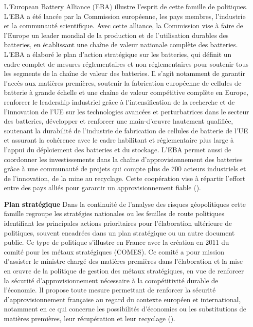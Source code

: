 L'European Battery Alliance (EBA) illustre l'esprit de cette famille de politiques. L'EBA a été lancée par la Commission européenne, les pays membres, l'industrie et la communauté scientifique. Avec cette alliance, la Commission vise à faire de l'Europe un leader mondial de la production et de l'utilisation durables des batteries, en établissant une chaîne de valeur nationale complète des batteries. \smallbreak
L'EBA a élaboré le plan d'action stratégique sur les batteries, qui définit un cadre complet de mesures réglementaires et non réglementaires pour soutenir tous les segments de la chaîne de valeur des batteries. Il s'agit notamment de garantir l'accès aux matières premières, soutenir la fabrication européenne de cellules de batterie à grande échelle et une chaîne de valeur compétitive complète en Europe, renforcer le leadership industriel grâce à l'intensification de la recherche et de l'innovation de l'UE sur les technologies avancées et perturbatrices dans le secteur des batteries, développer et renforcer une main-d'œuvre hautement qualifiée, soutenant la durabilité de l'industrie de fabrication de cellules de batterie de l'UE et assurant la cohérence avec le cadre habilitant et réglementaire plus large à l'appui du déploiement des batteries et du stockage. 
L'EBA permet aussi de coordonner les investissements dans la chaîne d'approvisionnement des batteries grâce à une communauté de projets qui compte plus de 700 acteurs industriels et de l'innovation, de la mine au recyclage. Cette coopération vise à répartir l'effort entre des pays alliés pour garantir un approvisionnement fiable (\cite{eba_building_nodate}).\bigbreak

\textbf{Plan stratégique}\smallbreak
Dans la continuité de l'analyse des risques géopolitiques cette famille regroupe les stratégies nationales ou les feuilles de route politiques identifiant les principales actions prioritaires pour l'élaboration ultérieure de politiques, souvent encadrées dans un plan stratégique ou un autre document public.\smallbreak
Ce type de politique s'illustre en France avec la création en 2011 du comité pour les métaux stratégiques (COMES). Ce comité a pour mission d'assister le ministre chargé des matières premières dans l'élaboration et la mise en œuvre de la politique de gestion des métaux stratégiques, en vue de renforcer la sécurité d'approvisionnement nécessaire à la compétitivité durable de l'économie.\smallbreak
Il propose toute mesure permettant de renforcer la sécurité d'approvisionnement française au regard du contexte européen et international, notamment en ce qui concerne les possibilités d'économies ou les substitutions de matières premières, leur récupération et leur recyclage (\cite{legifrance_decret_2011}).